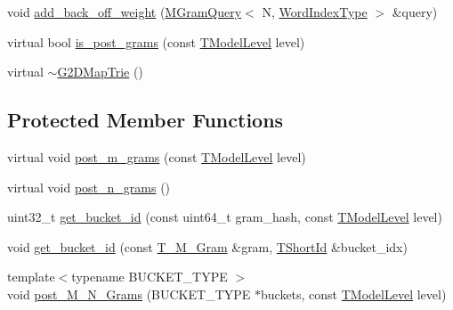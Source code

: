 \begin{DoxyCompactItemize}
\item 
void \hyperlink{classuva_1_1smt_1_1tries_1_1_g2_d_map_trie_a02f7e960d66ef11aa6ebbc338b3f8183}{add\+\_\+back\+\_\+off\+\_\+weight} (\hyperlink{structuva_1_1smt_1_1tries_1_1_m_gram_query}{M\+Gram\+Query}$<$ N, \hyperlink{classuva_1_1smt_1_1tries_1_1_word_index_trie_base_a30c4fffe3a3423c87b229b66340dd2f8}{Word\+Index\+Type} $>$ \&query)
\item 
virtual bool \hyperlink{classuva_1_1smt_1_1tries_1_1_g2_d_map_trie_a71523ced7125f6f55a1fb5ea91cc6e11}{is\+\_\+post\+\_\+grams} (const \hyperlink{namespaceuva_1_1smt_1_1tries_a20577a44b3a42d26524250634379b7cb}{T\+Model\+Level} level)
\item 
virtual \hyperlink{classuva_1_1smt_1_1tries_1_1_g2_d_map_trie_a4c9af9115b4bf94e869ab6de29491be8}{$\sim$\+G2\+D\+Map\+Trie} ()
\end{DoxyCompactItemize}
\subsection*{Protected Member Functions}
\begin{DoxyCompactItemize}
\item 
virtual void \hyperlink{classuva_1_1smt_1_1tries_1_1_g2_d_map_trie_a95618a18f8ecadef63d8d33fc1d3e0e6}{post\+\_\+m\+\_\+grams} (const \hyperlink{namespaceuva_1_1smt_1_1tries_a20577a44b3a42d26524250634379b7cb}{T\+Model\+Level} level)
\item 
virtual void \hyperlink{classuva_1_1smt_1_1tries_1_1_g2_d_map_trie_ad70a9f0ff58ffcda249492a16fc3faae}{post\+\_\+n\+\_\+grams} ()
\item 
uint32\+\_\+t \hyperlink{classuva_1_1smt_1_1tries_1_1_g2_d_map_trie_a6f924d69f1bc1034cae6ba0025600392}{get\+\_\+bucket\+\_\+id} (const uint64\+\_\+t gram\+\_\+hash, const \hyperlink{namespaceuva_1_1smt_1_1tries_a20577a44b3a42d26524250634379b7cb}{T\+Model\+Level} level)
\item 
void \hyperlink{classuva_1_1smt_1_1tries_1_1_g2_d_map_trie_ab024b2e90c2b364a777a512a3599226b}{get\+\_\+bucket\+\_\+id} (const \hyperlink{structuva_1_1smt_1_1tries_1_1mgrams_1_1_t___m___gram}{T\+\_\+\+M\+\_\+\+Gram} \&gram, \hyperlink{namespaceuva_1_1smt_1_1hashing_adcf22e1982ad09d3a63494c006267469}{T\+Short\+Id} \&bucket\+\_\+idx)
\item 
{\footnotesize template$<$typename B\+U\+C\+K\+E\+T\+\_\+\+T\+Y\+P\+E $>$ }\\void \hyperlink{classuva_1_1smt_1_1tries_1_1_g2_d_map_trie_a2459fb26fc153185feecc0eb06a6438d}{post\+\_\+\+M\+\_\+\+N\+\_\+\+Grams} (B\+U\+C\+K\+E\+T\+\_\+\+T\+Y\+P\+E $\ast$buckets, const \hyperlink{namespaceuva_1_1smt_1_1tries_a20577a44b3a42d26524250634379b7cb}{T\+Model\+Level} level)
\end{DoxyCompactItemize}
